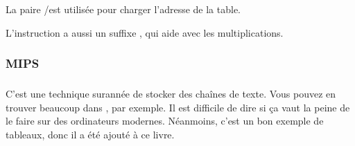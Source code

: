 La paire \ADRP/\ADD est utilisée pour charger l'adresse de la table.

L'instruction \ADD a aussi un suffixe \LSL, qui aide avec les multiplications.

\subsubsection{MIPS}


\subsubsection{\Conclusion{}}

C'est une technique surannée de stocker des chaînes de texte.
Vous pouvez en trouver beaucoup dans \oracle, par exemple.
Il est difficile de dire si ça vaut la peine de le faire sur des ordinateurs modernes.
Néanmoins, c'est un bon exemple de tableaux, donc il a été ajouté à ce livre.

